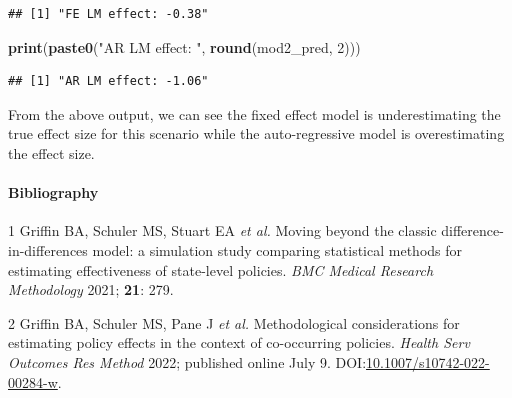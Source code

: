 \documentclass[
]{article}
\newenvironment{Shaded}{\begin{snugshade}}{\end{snugshade}}
\newcommand{\DecValTok}[1]{\textcolor[rgb]{0.00,0.00,0.81}{#1}}
\newcommand{\KeywordTok}[1]{\textcolor[rgb]{0.13,0.29,0.53}{\textbf{#1}}}
\newcommand{\NormalTok}[1]{#1}
\newcommand{\StringTok}[1]{\textcolor[rgb]{0.31,0.60,0.02}{#1}}
\newenvironment{cslreferences}%
  {}%
  {\par}
\begin{document}
\begin{verbatim}
## [1] "FE LM effect: -0.38"
\end{verbatim}

\begin{Shaded}
\begin{Highlighting}[]
\KeywordTok{print}\NormalTok{(}\KeywordTok{paste0}\NormalTok{(}\StringTok{"AR LM effect: "}\NormalTok{, }\KeywordTok{round}\NormalTok{(mod2\_pred, }\DecValTok{2}\NormalTok{)))}
\end{Highlighting}
\end{Shaded}

\begin{verbatim}
## [1] "AR LM effect: -1.06"
\end{verbatim}

From the above output, we can see the fixed effect model is
underestimating the true effect size for this scenario while the
auto-regressive model is overestimating the effect size.

\hypertarget{bibliography}{%
\paragraph*{Bibliography}\label{bibliography}}

\hypertarget{refs}{}
\begin{cslreferences}
\leavevmode\hypertarget{ref-http:ux2fux2fzotero.orgux2fusersux2f3390799ux2fitemsux2fZNCVTPJF}{}%
1 Griffin BA, Schuler MS, Stuart EA \emph{et al.} Moving beyond the
classic difference-in-differences model: a simulation study comparing
statistical methods for estimating effectiveness of state-level
policies. \emph{BMC Medical Research Methodology} 2021; \textbf{21}:
279.

\leavevmode\hypertarget{ref-http:ux2fux2fzotero.orgux2fusersux2f3390799ux2fitemsux2fV3Q6ARUA}{}%
2 Griffin BA, Schuler MS, Pane J \emph{et al.} Methodological
considerations for estimating policy effects in the context of
co-occurring policies. \emph{Health Serv Outcomes Res Method} 2022;
published online July 9.
DOI:\href{https://doi.org/10.1007/s10742-022-00284-w}{10.1007/s10742-022-00284-w}.
\end{cslreferences}
\end{document}
